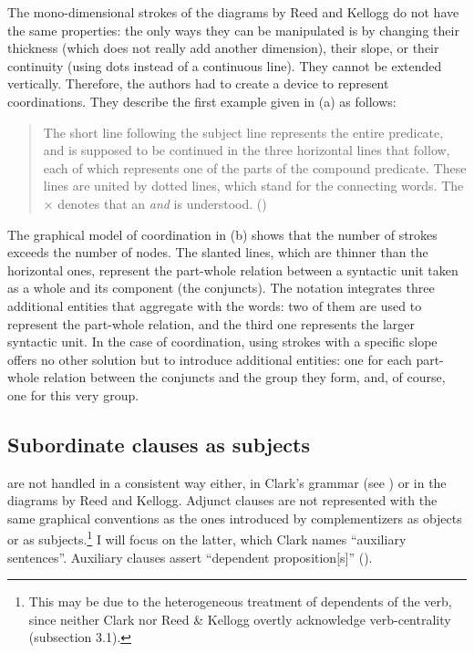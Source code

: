 \documentclass[output=paper]{langsci/langscibook}
\begin{document}
The mono-dimensional strokes of the diagrams by Reed and Kellogg do not have the same properties: the only ways they can be manipulated is by changing their thickness (which does not really add another dimension), their slope, or their continuity (using dots instead of a continuous line). They cannot be extended vertically. Therefore, the authors had to create a device to represent coordinations. They describe the first example given in (a) as follows:

\begin{quote}
The short line following the subject line represents the entire predicate, and is supposed to be continued in the three horizontal lines that follow, each of which represents one of the parts of the compound predicate. These lines are united by dotted lines, which stand for the connecting words. The × denotes that an \textit{and} is understood. (\citealt[47--48]{reed_graded_1879})
\end{quote}

The graphical model of coordination in (b) shows that the number of strokes exceeds the number of nodes. The slanted lines, which are thinner than the horizontal ones, represent the part-whole relation between a syntactic unit taken as a whole and its component (the conjuncts). The notation integrates three additional entities that aggregate with the words: two of them are used to represent the part-whole relation, and the third one represents the larger syntactic unit. In the case of coordination, using strokes with a specific slope offers no other solution but to introduce additional entities: one for each part-whole relation between the conjuncts and the group they form, and, of course, one for this very group.

\subsection{Subordinate clauses as subjects}

 are not handled in a consistent way either, in Clark’s grammar  (see \citealt[319--322 and 328--329]{mazziotta_drawing_2016}) or in the diagrams by Reed and Kellogg. Adjunct clauses are not represented with the same graphical conventions as the ones introduced by complementizers as objects or as subjects.\footnote{ \textrm{This may be due to the heterogeneous treatment of dependents of the verb, since neither Clark nor Reed \& Kellogg overtly acknowledge verb-centrality (subsection 3.1).}} I will focus on the latter, which Clark names “auxiliary sentences”. Auxiliary clauses assert “dependent proposition[s]” (\citeyear[187]{clark_normal_1870}).
\end{document}
